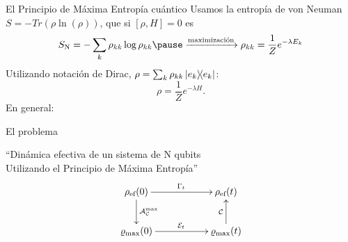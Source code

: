\begin{frame}{El Principio de Máxima Entropía cuántico}
    Usamos la entropía de von Neuman $S=-Tr(\rho\ln(\rho))$, \pause que si $[\rho,H]=0$ \pause es
    \begin{equation}
        S_{\text{N}}=-\sum_{k}\rho_{kk}\log{\rho_{kk}}\pause\xrightarrow{\text{maximización}}\rho_{kk}=\frac{1}{Z}e^{-\lambda E_{k}}\nonumber
    \end{equation}\pause
    Utilizando notación de Dirac, $\rho=\sum_{k}\rho_{kk}\dyad{e_{k}}$:\pause
    \begin{equation}
        \rho=\frac{1}{Z}e^{-\lambda H}.\nonumber
    \end{equation}\pause
    En general:
    \begin{center}
    \end{center}
\end{frame}


\begin{frame}{El problema}
    \begin{center}
        ``Dinámica efectiva de un sistema de N qubits\\
        Utilizando el Principio de Máxima Entropía''
        \begin{displaymath}
            \xymatrix{
              {\rho_{\ef}(0)} \ar[rr]^{\Gamma_{t}} \ar[d]^{\mcA_{\mcC}^{\max}}
              && {\rho_{\ef}(t)}\\
              {\varrho_{\max}(0)} \ar[rr]^{\mcE_{t}}
              && {\varrho_{\max}(t)} \ar[u]^{\mcC}
            }
          \end{displaymath}
    \end{center}
\end{frame}
